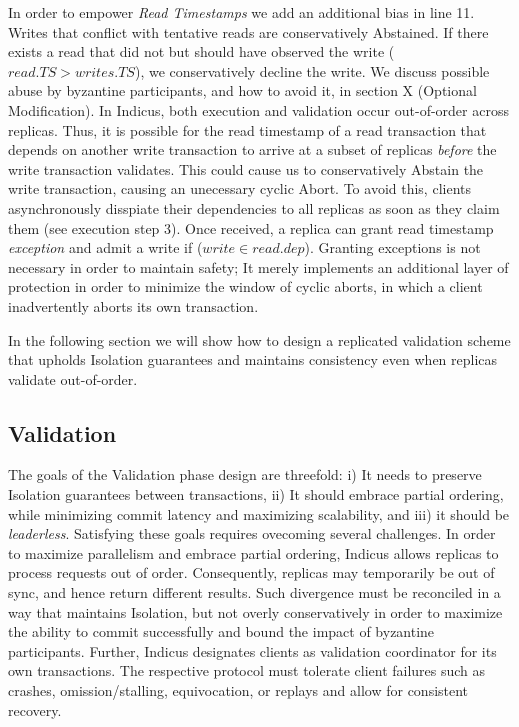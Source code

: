 In order to empower \textit{Read Timestamps} we add an additional bias in line 11. Writes that conflict with tentative reads are conservatively Abstained. If there exists a read that did not but should have observed the write ($read.TS > writes.TS$), we conservatively decline the write. We discuss possible abuse by byzantine participants, and how to avoid it, in section X (Optional Modification). In Indicus, both execution and validation occur out-of-order across replicas. Thus, it is possible for the read timestamp of a read transaction that depends on another write transaction to arrive at a subset of replicas \textit{before} the write transaction validates. This could cause us to conservatively Abstain the write transaction, causing an unecessary cyclic Abort. To avoid this, clients asynchronously disspiate their dependencies to all replicas as soon as they claim them (see execution step 3). Once received, a replica can grant read timestamp \textit{exception} and admit a write if ($write \in read.dep$). Granting exceptions is not necessary in order to maintain safety; It merely implements an additional layer of protection in order to minimize the window of cyclic aborts, in which a client inadvertently aborts its own transaction. 

In the following section we will show how to design a replicated validation scheme that upholds Isolation guarantees and maintains consistency even when replicas validate out-of-order.




\subsection{Validation}
The goals of the Validation phase design are threefold: i) It needs to preserve Isolation guarantees between transactions, ii) It should embrace partial ordering, while minimizing commit latency and  maximizing scalability, and iii) it should be \textit{leaderless}. Satisfying these goals requires ovecoming several challenges. In order to maximize parallelism and embrace partial ordering, Indicus allows replicas to process requests out of order. Consequently, replicas may temporarily be out of sync, and hence return different results. Such divergence must be reconciled in a way that maintains Isolation, but not overly conservatively in order to maximize the ability to commit successfully and bound the impact of byzantine participants. Further, Indicus designates clients as validation coordinator for its own transactions. The respective protocol must tolerate client failures such as crashes, omission/stalling, equivocation, or replays and allow for consistent recovery. 

